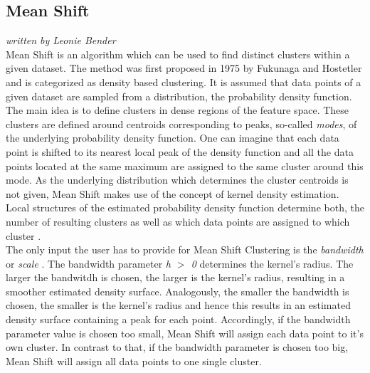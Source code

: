 \subsection{Mean Shift}
\textit{written by Leonie Bender}\\

Mean Shift is an algorithm which can be used to find distinct clusters within a given dataset. 
The method was first proposed in 1975 by Fukunaga and Hostetler \cite{fukunaga1975estimation} and is categorized as density based clustering.
It is assumed that data points of a given dataset are sampled from a distribution, the probability density function. The main idea is to define clusters in dense regions of the feature space. These clusters are defined around centroids corresponding to peaks, so-called \textit{modes}, of the underlying probability density function. One can imagine that each data point is shifted to its nearest local peak of the density function and all the data points located at the same maximum are assigned to the same cluster around this mode. As the underlying distribution which determines the cluster centroids is not given, Mean Shift makes use of the concept of kernel density estimation. Local structures of the estimated probability density function determine both, the number of resulting clusters as well as which data points are assigned to which cluster \cite{comaniciu2002MeanShift}.  \\
The only input the user has to provide for Mean Shift Clustering is the \textit{bandwidth} or \textit{scale} \cite{scikit-learn}. The bandwidth parameter \textit{h $>$ 0} determines the kernel's radius. The larger the bandwitdh is chosen, the larger is the kernel's radius, resulting in a smoother estimated density surface. Analogously, the smaller the bandwidth is chosen, the smaller is the kernel's radius and hence this results in an estimated density surface containing a peak for each point.
Accordingly, if the bandwidth parameter value is chosen too small, Mean Shift will assign each data point to it's own cluster. In contrast to that, if the bandwidth parameter is chosen too big, Mean Shift will assign all data points to one single cluster.  

